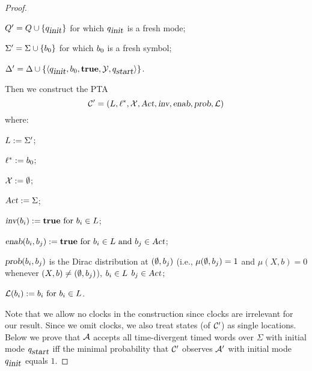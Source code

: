 \begin{proof}
\begin{compactitem}
\item $Q'   = Q  \cup \{ q_{\mbox{\sl init} } \}$ for which $q_{\mbox{\sl init} }$ is a fresh mode;
\item $\Sigma'  = \Sigma \cup \{ b_{0} \}$ for which $b_{0}$ is a fresh symbol;
\item $\Delta'     = \Delta    \cup \{ \langle
            q_{\mbox{\sl init} },
            b_{0},
            \mathbf{true},
            \mathcal{Y},
            q_{\mbox{\sl start}}
        \rangle
    \}$.
\end{compactitem}
Then we construct the PTA
\[
\mathcal{C}'=\left(L, \ell^*, \mathcal{X}, \mbox{\sl Act}, \mbox{\sl inv}, \mbox{\sl enab},  \mbox{\sl prob}, \mathcal{L}\right)
\]
where:
\begin{compactitem}
    \item $L      :=  \Sigma'$;
    \item $\ell^*     :=  b_{0} $;
    \item $\mathcal{X}    :=  \emptyset $;
    \item $\mbox{\sl Act}      :=  \Sigma $;
    \item $\mbox{\sl inv}(b_{i})              :=  \mathbf{true}
                                            \text{ for }
                                            b_{i} \in L$;
    \item $\mbox{\sl enab}(b_{i},b_{j})   :=  \mathbf{true}
                                            \text{ for }
                                            b_{i} \in L
                                            \text{ and }
                                            b_{j} \in \mbox{\sl Act}$;
    \item $\mbox{\sl prob}(b_{i},b_{j})$ is the Dirac distribution at $(\emptyset,b_{j})$ (i.e., $\mu(\emptyset,b_{j})=1$ and $\mu(X,b)=0$ whenever $(X,b)\ne(\emptyset,b_{j})$),
                                            $b_{i} \in L$
                                            $b_{j} \in \mbox{\sl Act}$;
    \item $\mathcal{L}(b_{i})           :=  b_{i}
                                            \text{ for } b_{i} \in L$.
\end{compactitem}
Note that we allow no clocks in the construction since clocks are irrelevant for our result.
Since we omit clocks, we also treat states (of $\mathcal{C}'$) as single locations.
Below we prove that $\mathcal{A}$ accepts all time-divergent timed words over $\Sigma$ with initial mode $q_{\mbox{\sl start}}$ iff
the minimal probability that $\mathcal{C}'$ observes $\mathcal{A}'$ with initial mode $q_{\mbox{\sl init} }$ equals $1$.  


\end{proof}
